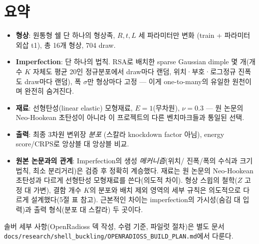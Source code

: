 \documentclass[11pt]{article}
\begin{document}
\section{요약}

\begin{itemize}
\item \textbf{형상}: 원통형 쉘 단 하나의 형상족, $R,t,L$ 세 파라미터만 변화
      (train + 파라미터외삽 t1), 총 16개 형상, 704 draw.
\item \textbf{Imperfection}: 단 하나의 법칙. RSA로 배치한 sparse Gaussian
      dimple 몇 개(개수 $K$ 자체도 평균 20인 정규분포에서 draw마다 랜덤,
      위치·부호·로그정규 진폭도 draw마다 랜덤), 폭 $\sigma$만 형상마다 고정
      --- 이게 one-to-many의 유일한 원천이며 완전히 숨겨진다.
\item \textbf{재료}: 선형탄성(linear elastic) 모형재료, $E{=}1$(무차원),
      $\nu{=}0.3$ --- 원 논문의 Neo-Hookean 초탄성이 아니라 이 프로젝트의
      다른 벤치마크들과 통일된 선택.
\item \textbf{출력}: 최종 3차원 변위장 \emph{분포} (스칼라 knockdown factor 아님),
      energy score/CRPS로 앙상블 대 앙상블 비교.
\item \textbf{원본 논문과의 관계}: Imperfection의 생성 \emph{메커니즘}(위치/
      진폭/폭의 수식과 크기법칙, 최소 분리거리)은 검증 후 정확히 계승했다.
      재료는 원 논문의 Neo-Hookean 초탄성과 다르게 선형탄성 모형재료를
      쓴다(의도적 차이). 형상 스윕의
      철학($Z$ 고정 대 가변), 결함 개수 $K$의 분포와 배치 제외 영역의 세부
      규칙은 의도적으로 다르게 설계했다(5절 표 참고). 근본적인 차이는
      imperfection의 가시성(숨김 대 입력)과 출력 형식(분포 대 스칼라) 두
      곳이다.
\end{itemize}

솔버 세부 사항(OpenRadioss 덱 작성, 수렴 기준, 파일럿 절차)은 별도 문서
\texttt{docs/research/shell\_buckling/OPENRADIOSS\_BUILD\_PLAN.md}에서 다룬다.
\end{document}
